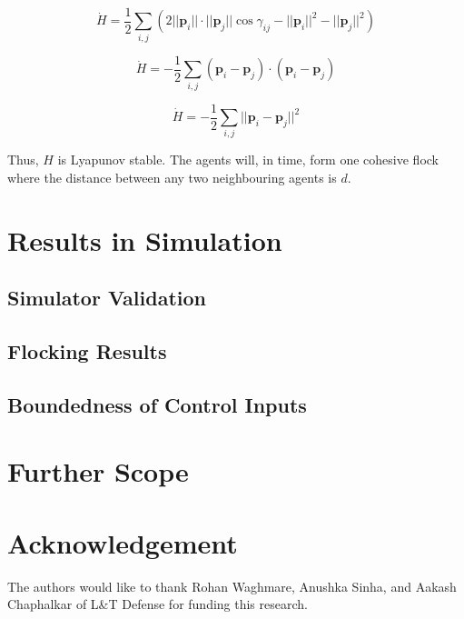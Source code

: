 \documentclass[letterpaper, 10 pt, conference]{ieeeconf}  %
\begin{document}
\begin{equation}
    \dot{H} = \frac{1}{2} \sum_{i,j} (2 ||\mathbf{p}_i|| \cdot ||\mathbf{p}_j|| \cos\gamma_{ij} - ||\mathbf{p}_i||^2 - ||\mathbf{p}_j||^2)
\end{equation}

\begin{equation}
    \dot{H} = -\frac{1}{2} \sum_{i,j} (\mathbf{p}_i - \mathbf{p}_j) \cdot (\mathbf{p}_i - \mathbf{p}_j)
\end{equation}

\begin{equation}
    \dot{H} = -\frac{1}{2} \sum_{i,j} ||\mathbf{p}_i - \mathbf{p}_j||^2
\end{equation}

Thus, $H$ is Lyapunov stable. The agents will, in time, form one cohesive flock where the distance between any two neighbouring agents is $d$.

\section{Results in Simulation}

\subsection{Simulator Validation}



\subsection{Flocking Results}

\subsection{Boundedness of Control Inputs}

\section{Further Scope}

\section{Acknowledgement}

The authors would like to thank Rohan Waghmare, Anushka Sinha, and Aakash Chaphalkar of L\&T Defense for funding this research.

\printbibliography
\end{document}
